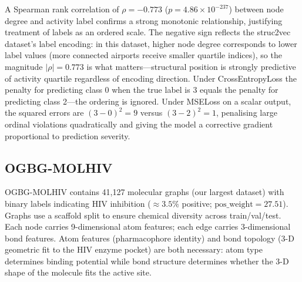 \documentclass[conference]{IEEEtran}
\begin{document}
A Spearman rank correlation of $\rho = -0.773$ ($p = 4.86 \times 10^{-237}$) between node degree and activity label confirms a strong monotonic relationship, justifying treatment of labels as an ordered scale. The negative sign reflects the struc2vec dataset's label encoding: in this dataset, higher node degree corresponds to lower label values (more connected airports receive smaller quartile indices), so the magnitude $|\rho|=0.773$ is what matters---structural position is strongly predictive of activity quartile regardless of encoding direction. Under CrossEntropyLoss the penalty for predicting class 0 when the true label is 3 equals the penalty for predicting class 2---the ordering is ignored. Under MSELoss on a scalar output, the squared errors are $(3-0)^2 = 9$ versus $(3-2)^2 = 1$, penalising large ordinal violations quadratically and giving the model a corrective gradient proportional to prediction severity.

\subsection{OGBG-MOLHIV}

OGBG-MOLHIV \cite{hu2020} contains 41,127 molecular graphs (our largest dataset) with binary labels indicating HIV inhibition ($\approx 3.5\%$ positive; $\text{pos\_weight} = 27.51$). Graphs use a scaffold split to ensure chemical diversity across train/val/test. Each node carries 9-dimensional atom features; each edge carries 3-dimensional bond features. Atom features (pharmacophore identity) and bond topology (3-D geometric fit to the HIV enzyme pocket) are both necessary: atom type determines binding potential while bond structure determines whether the 3-D shape of the molecule fits the active site.

\begin{table}[t]
\caption{Dataset Statistics}
\label{tab:datasets}
\centering
{}
\end{table}
\end{document}
